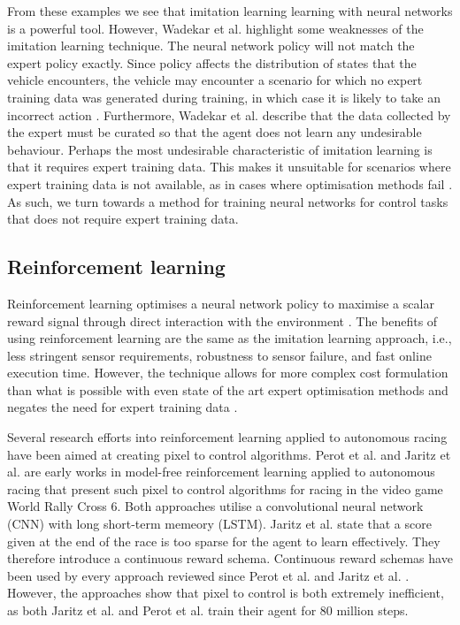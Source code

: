 From these examples we see that imitation learning learning with neural networks is a powerful tool.
However, Wadekar et al. \cite{Wadekar2021} highlight some weaknesses of the imitation learning technique.
The neural network policy will not match the expert policy exactly. 
Since policy affects the distribution of states that the vehicle encounters, the vehicle may encounter a scenario for which no expert training data was generated during training, in which case it is likely to take an incorrect action \cite{Osa_2018}.
Furthermore, Wadekar et al. \cite{Wadekar2021} describe that the data collected by the expert must be curated so that the agent does not learn any undesirable behaviour.
Perhaps the most undesirable characteristic of imitation learning is that it requires expert training data.
This makes it unsuitable for scenarios where expert training data is not available, as in cases where optimisation methods fail \cite{Fuchs2021a}.
As such, we turn towards a method for training neural networks for control tasks that does not require expert training data.

\subsection{Reinforcement learning}
\label{sec:reinforcement_learning}

Reinforcement learning optimises a neural network policy to maximise a scalar reward signal through direct interaction with the environment \cite{Plaat_2022}. 
The benefits of using reinforcement learning are the same as the imitation learning approach, i.e., less stringent sensor requirements, robustness to sensor failure, and fast online execution time. However, the technique allows for more complex cost formulation than what is possible with even state of the art expert optimisation methods and negates the need for expert training data \cite{Fuchs2021}.


Several research efforts into reinforcement learning applied to autonomous racing have been aimed at creating pixel to control algorithms. 
Perot et al. \cite{Perot2017} and Jaritz et al. \cite{Jaritz2018} are early works in model-free reinforcement learning applied to autonomous racing that present such pixel to control algorithms for racing in the video game World Rally Cross 6.
Both approaches utilise a convolutional neural network (CNN) with long short-term memeory (LSTM). 
Jaritz et al. \cite{Jaritz2018} state that a score given at the end of the race is too sparse for the agent to learn effectively.
They therefore introduce a continuous reward schema.
Continuous reward schemas have been used by every approach reviewed since Perot et al. \cite{Perot2017} and Jaritz et al. \cite{Jaritz2018}.
However, the approaches show that pixel to control is both extremely inefficient, as both Jaritz et al. \cite{Jaritz2018} and Perot et al. \cite{Perot2017} train their agent for 80 million steps.




